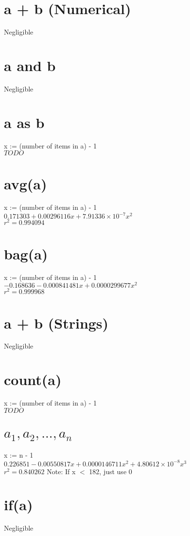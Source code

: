 \documentclass[12pt]{article}
\begin{document}
	\section{a + b (Numerical)}
	Negligible
	
	\section{a and b}
	Negligible
	
	\section{a as b}
	x := (number of items in a) - 1\\
	$TODO$
	
	\section{avg(a)}
	x := (number of items in a) - 1\\
	$0.171303 + 0.00296116x + 7.91336 \times 10^{-7} x^2$\\
	$r^2 = 0.994094$

	\section{bag(a)}
	x := (number of items in a) - 1\\
	$-0.168636 - 0.000841481x + 0.0000299677x^2$\\
	$r^2 = 0.999968$
	
	\section{a + b (Strings)}
	Negligible
	
	\section{count(a)}
	x := (number of items in a) - 1\\
	$TODO$
	
	\section{$a_1, a_2, ..., a_n$}
	x := n - 1\\
	$0.226851 - 0.00550817x + 0.0000146711x^2 + 4.80612 \times 10^{-8} x^3$\\
	$r^2 = 0.840262$
	Note: If x $<$ 182, just use 0
	
	\section{if(a)}
	Negligible
	
\end{document}
